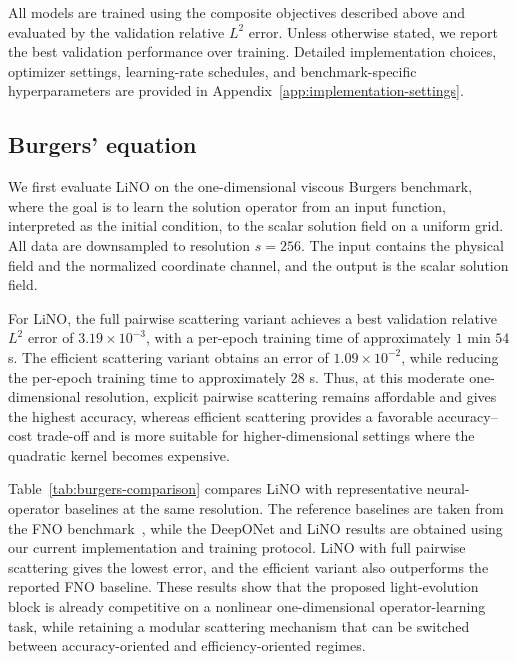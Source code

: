 \documentclass{article}
\begin{document}
All models are trained using the composite objectives described above and evaluated by the validation relative $L^2$ error. Unless otherwise stated, we report the best validation performance over training. Detailed implementation choices, optimizer settings, learning-rate schedules, and benchmark-specific hyperparameters are provided in Appendix~\ref{app:implementation-settings}.

\subsection{Burgers' equation}

We first evaluate LiNO on the one-dimensional viscous Burgers benchmark, where the goal is to learn the solution operator from an input function, interpreted as the initial condition, to the scalar solution field on a uniform grid. 
All data are downsampled to resolution $s=256$. 
The input contains the physical field and the normalized coordinate channel, and the output is the scalar solution field.

For LiNO, the full pairwise scattering variant achieves a best validation relative $L^2$ error of $3.19\times10^{-3}$, with a per-epoch training time of approximately $1$ min $54$ s. 
The efficient scattering variant obtains an error of $1.09\times10^{-2}$, while reducing the per-epoch training time to approximately $28$ s. 
Thus, at this moderate one-dimensional resolution, explicit pairwise scattering remains affordable and gives the highest accuracy, whereas efficient scattering provides a favorable accuracy--cost trade-off and is more suitable for higher-dimensional settings where the quadratic kernel becomes expensive.

Table~\ref{tab:burgers-comparison} compares LiNO with representative neural-operator baselines at the same resolution. 
The reference baselines are taken from the FNO benchmark~\cite{li2021fno}, while the DeepONet and LiNO results are obtained using our current implementation and training protocol. 
LiNO with full pairwise scattering gives the lowest error, and the efficient variant also outperforms the reported FNO baseline. 
These results show that the proposed light-evolution block is already competitive on a nonlinear one-dimensional operator-learning task, while retaining a modular scattering mechanism that can be switched between accuracy-oriented and efficiency-oriented regimes.
\end{document}
